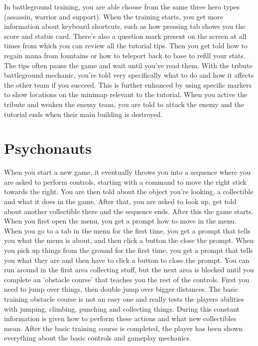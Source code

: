 In battleground training, you are able choose from the same three hero types (assassin, warrior and support).
When the training starts, you get more information about keyboard shortcuts, such as how pressing tab shows you the score and status card.
There's also a question mark present on the screen at all times from which you can review all the tutorial tips.
Then you get told how to regain mana from fountains or how to teleport back to base to refill your stats.
The tips often pause the game and wait until you've read them.
With the tribute battleground mechanic, you're told very specifically what to do and how it affects the other team if you succeed. This is further enhanced by using specific markers to show locations on the minimap relevant to the tutorial.
When you active the tribute and weaken the enemy team, you are told to attack the enemy and the tutorial ends when their main building is destroyed.

\section{Psychonauts}

When you start a new game, it eventually throws you into a sequence where you are asked to perform controls, starting with a command to move the right stick towards the right. You are then told about the object you're looking, a collectible and what it does in the game. After that, you are asked to look up, get told about another collectible there and the sequence ends. After this the game starts.
When you first open the menu, you get a prompt how to move in the menu.
When you go to a tab in the menu for the first time, you get a prompt that tells you what the menu is about, and then click a button the close the prompt.
When you pick up things from the ground for the first time, you get a prompt that tells you what they are and then have to click a button to close the prompt.
You can run around in the first area collecting stuff, but the next area is blocked until you complete an 'obstacle course' that teaches you the rest of the controls.
First you need to jump over things, then double jump over bigger distances.
The basic training obstacle course is not an easy one and really tests the players abilities with jumping, climbing, punching and collecting things. During this constant information is given how to perform these actions and what new collectibles mean.
After the basic training course is completed, the player has been shown everything about the basic controls and gameplay mechanics.

